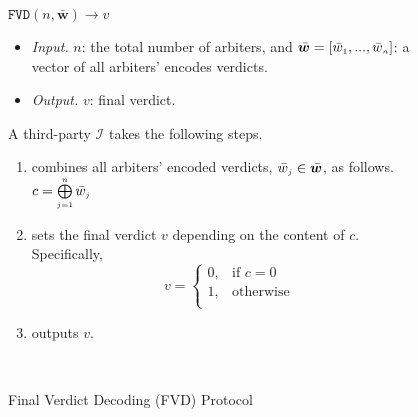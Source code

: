 %
\begin{figure}[!ht]
\setlength{\fboxsep}{0.7pt}
\begin{center}
\begin{boxedminipage}{12.3cm}
\small{
\underline{$\mathtt{FVD}(n,  \bar{\bm w})\rightarrow  v$}\\
%
\begin{itemize}
\item \noindent\textit{Input.} $n$:  the total number of  arbiters,  and  $\bar{\bm w}=[\bar{ w}_{\scriptscriptstyle 1},..., \bar{ w}_{\scriptscriptstyle n}]$:  a vector of all arbiters' encodes  verdicts.
%
\item \noindent\textit{Output.} $v$: final verdict.  
%
\end{itemize}
A third-party $\mathcal{I}$ takes the following steps.
\begin{enumerate}
%
\item combines  all arbiters' encoded verdicts, $\bar w_{\scriptscriptstyle j}\in \bar{\bm {w}}$, as follows. 
%
$c= \bigoplus\limits^{\scriptscriptstyle n}_{\scriptscriptstyle j=1} \bar w_{\scriptscriptstyle j}$
%
\item sets the final verdict $v$ depending on the content of $c$. Specifically, 
%
\begin{equation*}
   v= 
\begin{cases}
    0,              &\text{if } c= 0\\
   1 ,& \text{otherwise }\\

\end{cases}
\end{equation*}
%
\item outputs  $v$. 

\
 \end{enumerate}
 
}
\end{boxedminipage}
\end{center}
\caption{Final Verdict Decoding  (FVD) Protocol} 
\label{fig:FVD}
\end{figure}

